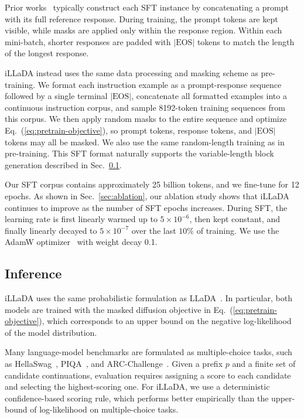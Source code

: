 \documentclass[]{bytedance_seed}
\begin{document}
Prior works~\citep{nie2026large,zhu2025llada,you2025llada} typically construct each SFT instance by concatenating a prompt with its full reference response. During training, the prompt tokens are kept visible, while masks are applied only within the response region. Within each mini-batch, shorter responses are padded with \( |\text{EOS}| \) tokens to match the length of the longest response.


iLLaDA instead uses the same data processing and masking scheme as pre-training. We format each instruction example as a prompt-response sequence followed by a single terminal \( |\text{EOS}| \), concatenate all formatted examples into a continuous instruction corpus, and sample 8192-token training sequences from this corpus. We then apply random masks to the entire sequence and optimize Eq.~(\ref{eq:pretrain-objective}), so prompt tokens, response tokens, and \( |\text{EOS}| \) tokens may all be masked. We also use the same random-length training as in pre-training. This SFT format naturally supports the variable-length block generation described in Sec.~\ref{sec:inference}.


Our SFT corpus contains approximately 25 billion tokens, and we fine-tune for 12 epochs. As shown in Sec.~\ref{sec:ablation}, our ablation study shows that iLLaDA continues to improve as the number of SFT epochs increases. During SFT, the learning rate is first linearly warmed up to \(5 \times 10^{-6}\), then kept constant, and finally linearly decayed to \(5 \times 10^{-7}\) over the last \(10\%\) of training. We use the AdamW optimizer~\citep{loshchilov2017decoupled} with weight decay 0.1.

\subsection{Inference}
\label{sec:inference}

iLLaDA uses the same probabilistic formulation as LLaDA~\citep{nie2026large}. In particular, both models are trained with the masked diffusion objective in Eq.~(\ref{eq:pretrain-objective}), which corresponds to an upper bound on the negative log-likelihood of the
model distribution.

Many language-model benchmarks are formulated as multiple-choice tasks, such as HellaSwag~\citep{zellers2019hellaswag}, PIQA~\citep{bisk2020piqa}, and ARC-Challenge~\citep{clark2018think}. Given a prefix \(p\) and a finite set of candidate continuations, evaluation requires assigning a score to each candidate and selecting the highest-scoring one. For iLLaDA, we use a deterministic confidence-based scoring rule, which performs better empirically than the upper-bound of log-likelihood on multiple-choice tasks.
\end{document}
